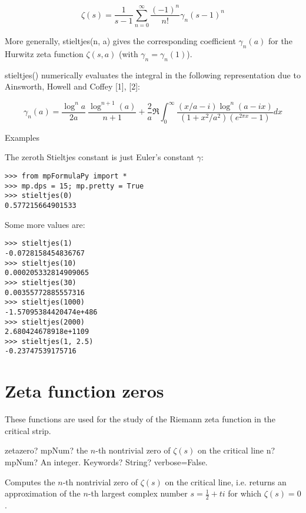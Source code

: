 \begin{equation}
\zeta(s) = \frac{1}{s-1} \sum_{n=0}^{\infty} \frac{(-1)^n}{n!} \gamma_n(s-1)^n
\end{equation}

More generally, stieltjes(n, a) gives the corresponding coefficient $\gamma_n(a)$ for the Hurwitz zeta function $\zeta(s,a)$ (with $\gamma_n=\gamma_n(1)$).

stieltjes() numerically evaluates the integral in the following representation due to Ainsworth, Howell and Coffey [1], [2]:

\begin{equation}
\gamma_n(a) = \frac{\log^n a}{2a} \ \frac{\log^{n+1}(a)}{n+1} + \frac{2}{a} \Re \int_0^{\infty} \frac{(x/a - i) \log^n(a-ix)}{(1+x^2/a^2)(e^{2\pi x}-1)} dx
\end{equation}

Examples

The zeroth Stieltjes constant is just Euler's constant $\gamma$:

\begin{lstlisting}
>>> from mpFormulaPy import *
>>> mp.dps = 15; mp.pretty = True
>>> stieltjes(0)
0.577215664901533
\end{lstlisting}

Some more values are:

\begin{lstlisting}
>>> stieltjes(1)
-0.0728158454836767
>>> stieltjes(10)
0.000205332814909065
>>> stieltjes(30)
0.00355772885557316
>>> stieltjes(1000)
-1.57095384420474e+486
>>> stieltjes(2000)
2.680424678918e+1109
>>> stieltjes(1, 2.5)
-0.23747539175716
\end{lstlisting}


\newpage
\section{Zeta function zeros}
These functions are used for the study of the Riemann zeta function in the critical strip.

\vpara

\begin{mpFunctionsExtract}
	\mpFunctionTwo
	{zetazero? mpNum? the $n$-th nontrivial zero of $\zeta(s)$ on the critical line}
	{n? mpNum? An integer.}
	{Keywords? String? verbose=False.}	
\end{mpFunctionsExtract}

\vpara
Computes the $n$-th nontrivial zero of $\zeta(s)$ on the critical line, i.e. returns an approximation of the $n$-th largest complex number $s=\tfrac{1}{2}+ti$ for which $\zeta(s)=0$.

